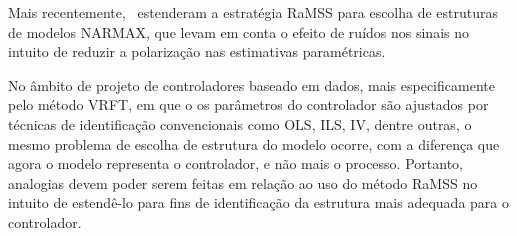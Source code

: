 
Mais recentemente,~\cite{retesNARMAXModelIdentification2019} estenderam a estratégia RaMSS para escolha de estruturas de modelos NARMAX, que levam em conta o efeito de ruídos nos sinais no intuito de reduzir a polarização nas estimativas paramétricas. 

No âmbito de projeto de controladores baseado em dados, mais especificamente pelo método VRFT, em que o os parâmetros do controlador são ajustados por técnicas de identificação convencionais como OLS, ILS, IV, dentre outras, o mesmo problema de escolha de estrutura do modelo ocorre, com a diferença que agora o modelo representa o controlador, e não mais o processo. Portanto, analogias devem poder serem feitas em relação ao uso do método RaMSS no intuito de estendê-lo para fins de identificação da estrutura mais adequada para o controlador.

